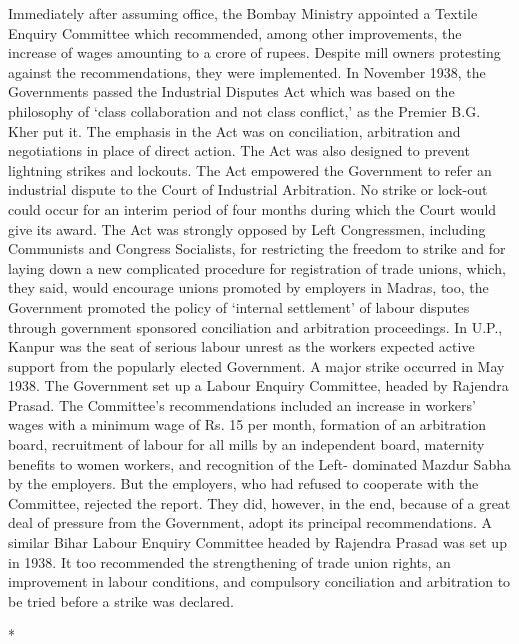 \begin{multicols}{2}
Immediately after assuming office, the Bombay Ministry appointed a Textile Enquiry Committee which recommended, among other improvements, the increase of wages amounting to a crore of rupees. Despite mill owners protesting against the recommendations, they were implemented. In November 1938, the Governments passed the Industrial Disputes Act which was based on the philosophy of `class collaboration and not class conflict,' as the Premier B.G. Kher put it. The emphasis in the Act was on conciliation, arbitration and negotiations in place of direct action. The Act was also designed to prevent lightning strikes and lockouts. The Act empowered the Government to refer an industrial dispute to the Court of Industrial Arbitration. No strike or lock-out could occur for an interim period of four months during which the Court would give its award. The Act was strongly opposed by Left Congressmen, including Communists and Congress Socialists, for restricting the freedom to strike and for laying down a new complicated procedure for registration of trade unions, which, they said, would encourage unions promoted by employers in Madras, too, the Government promoted the policy of `internal settlement' of labour disputes through government sponsored conciliation and arbitration proceedings. In U.P., Kanpur was the seat of serious labour unrest as the workers expected active support from the popularly elected Government. A major strike occurred in May 1938. The Government set up a Labour Enquiry Committee, headed by Rajendra Prasad. The Committee's recommendations included an increase in workers' wages with a minimum wage of Rs. 15 per month, formation of an arbitration board, recruitment of labour for all mills by an independent board, maternity benefits to women workers, and recognition of the Left- dominated Mazdur Sabha by the employers. But the employers, who had refused to cooperate with the Committee, rejected the report. They did, however, in the end, because of a great deal of pressure from the Government, adopt its principal recommendations. A similar Bihar Labour Enquiry Committee headed by Rajendra Prasad was set up in 1938. It too recommended the strengthening of trade union rights, an improvement in labour conditions, and compulsory conciliation and arbitration to be tried before a strike was declared.

\begin{center}*\end{center}

\paragraph*{}


\end{multicols}
